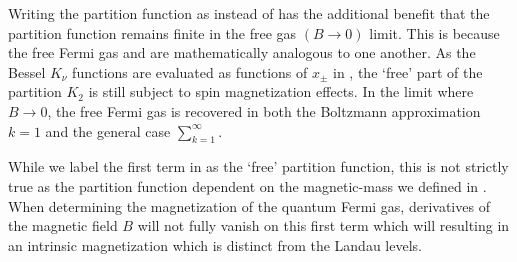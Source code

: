 Writing the partition function as  instead of  has the additional benefit that the partition function remains finite in the free gas $({B}\rightarrow0)$ limit. This is because the free Fermi gas and  are mathematically analogous to one another. As the Bessel $K_{\nu}$ functions are evaluated as functions of $x_{\pm}$ in , the `free' part of the partition $K_{2}$ is still subject to spin magnetization effects. In the limit where ${B}\rightarrow0$, the free Fermi gas is recovered in both the Boltzmann approximation $k=1$ and the general case $\sum_{k=1}^{\infty}$.

While we label the first term in  as the `free' partition function, this is not strictly true as the partition function dependent on the magnetic-mass we defined in . When determining the magnetization of the quantum Fermi gas, derivatives of the magnetic field $B$ will not fully vanish on this first term which will resulting in an intrinsic magnetization which is distinct from the Landau levels.

